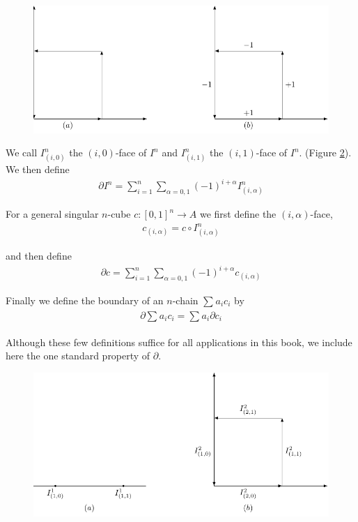 \begin{figure}[!htb]
    \centering
    \includegraphics[width=.75\linewidth]{./pics/Fig4-4.pdf}
    \caption{}
    \label{Fig 4-4}
\end{figure}

We call $I^n_{(i,0)}$ the $(i,0)$-face of $I^n$ and $I^n_{(i,1)}$ the $(i,1)$-face of $I^n$.
(Figure \ref{Fig 4-5}). We then define 
\begin{align*}
    \partial I^n = \sum_{i=1}^n \sum_{\alpha=0,1}(-1)^{i+\alpha}I^n_{(i,\alpha)}
\end{align*}

For a general singular $n$-cube $c:[0,1]^n\to A$ we first define the $(i,\alpha)$-face,
\begin{align*}
    c_{(i,\alpha)} = c\circ I^n_{(i,\alpha)}
\end{align*}

and then define 
\begin{align*}
    \partial c = \sum_{i=1}^n \sum_{\alpha=0,1}(-1)^{i+\alpha}c_{(i,\alpha)}
\end{align*}

Finally we define the boundary of an $n$-chain $\sum_{}^{}{a_ic_i}$ by 
\begin{align*}
    \partial \sum_{}^{}{a_ic_i} = \sum_{}^{}{a_i\partial c_i}
\end{align*}

Although these few definitions suffice for all applications in
this book, we include here the one standard property of $\partial$.

\begin{figure}[!htb]
    \centering
    \includegraphics[width=.75\linewidth]{./pics/Fig4-5.pdf}
    \caption{}
    \label{Fig 4-5}
\end{figure}


